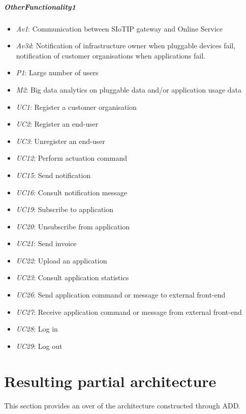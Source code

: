 \documentclass[english]{sareport}
\begin{document}
\paragraph{OtherFunctionality1}
\begin{itemize}
	\item \emph{Av1}: Communication between SIoTIP gateway and Online Service
	\item \emph{Av3d}: Notification of infrastructure owner when pluggable devices fail, notification of customer organisations when applications fail.
	\item \emph{P1}: Large number of users
	\item \emph{M2}: Big data analytics on pluggable data and/or application usage data
	\item \emph{UC1}: Register a customer organisation
	\item \emph{UC2}: Register an end-user
	\item \emph{UC3}: Unregister an end-user
	\item \emph{UC12}: Perform actuation command
	\item \emph{UC15}: Send notification
	\item \emph{UC16}: Consult notification message
	\item \emph{UC19}: Subscribe to application
	\item \emph{UC20}: Unsubscribe from application
	\item \emph{UC21}: Send invoice
	\item \emph{UC22}: Upload an application
	\item \emph{UC23}: Consult application statistics
	\item \emph{UC26}: Send application command or message to external front-end
	\item \emph{UC27}: Receive application command or message from external front-end
	\item \emph{UC28}: Log in
	\item \emph{UC29}: Log out
\end{itemize}


\chapter{Resulting partial architecture}\label{sec:architecture}
This section provides an over of the architecture constructed through ADD\@.
\end{document}
